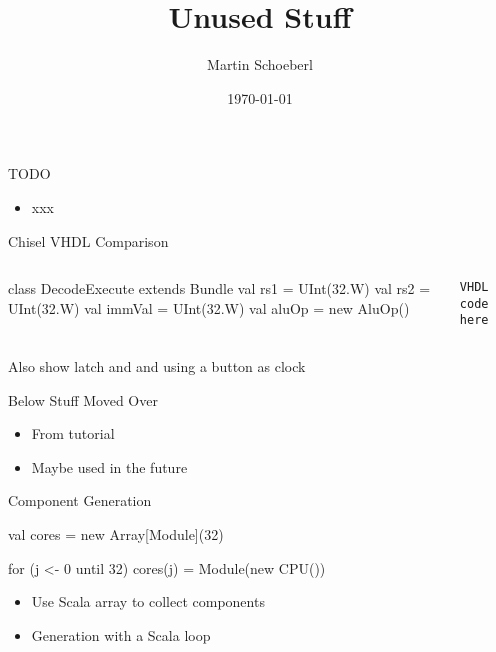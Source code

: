 

\newif\ifbook


\title{Unused Stuff}
\author{Martin Schoeberl}
\date{\today}



\begin{frame}
\titlepage
\end{frame}


\begin{frame}[fragile]{TODO}
\begin{itemize}
\item xxx
\end{itemize}
\end{frame}


\begin{frame}[fragile]{Chisel VHDL Comparison}
\begin{columns}
\begin{chisel}
class DecodeExecute extends Bundle {
  val rs1 = UInt(32.W)
  val rs2 = UInt(32.W)
  val immVal = UInt(32.W)
  val aluOp = new AluOp()
}
\end{chisel}
\begin{verbatim}
VHDL code here
\end{verbatim}
\end{columns}
Also show latch and and using a button as clock
\end{frame}

\begin{frame}[fragile]{Below Stuff Moved Over}
\begin{itemize}
\item From tutorial
\item Maybe used in the future
\end{itemize}
\end{frame}



\begin{frame}[fragile]{Component Generation}
\begin{chisel}
val cores = new Array[Module](32)

for (j <- 0 until 32)
  cores(j) = Module(new CPU())
\end{chisel}
\begin{itemize}
\item Use Scala array to collect components
\item Generation with a Scala loop
\end{itemize}
\end{frame}

